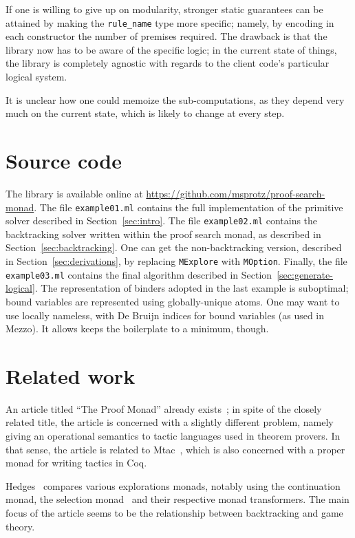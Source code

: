 \documentclass{easychair}
\def\li{\lstinline}
\newcommand{\sref}[1]{Section~\ref{sec:#1}}
\begin{document}
If one is willing to give up on modularity, stronger static guarantees can be
attained by making the \li+rule_name+ type more specific; namely, by encoding in
each constructor the number of premises required. The drawback is that the
library now has to be aware of the specific logic; in the current state of
things, the library is completely agnostic with regards to the client code's
particular logical system.

It is unclear how one could memoize the sub-computations, as they depend very
much on the current state, which is likely to change at every step.

\section{Source code}

The library is available online at
\url{https://github.com/msprotz/proof-search-monad}. The file \li+example01.ml+
contains the full implementation of the primitive solver described in
\sref{intro}. The file \li+example02.ml+ contains the backtracking solver
written within the proof search monad, as described in \sref{backtracking}. One
can get the non-backtracking version, described in \sref{derivations}, by
replacing \li+MExplore+ with \li+MOption+. Finally, the file \li+example03.ml+
contains the final algorithm described in \sref{generate-logical}. The
representation of binders adopted in the last example is suboptimal; bound
variables are represented using globally-unique atoms. One may want to use
locally nameless, with De Bruijn indices for bound variables (as used in Mezzo).
It allows keeps the boilerplate to a minimum, though.

\section{Related work}

An article titled ``The Proof Monad'' already exists~\cite{kirchner-munoz-10};
in spite of the closely related title, the article is concerned with a slightly
different problem, namely giving an operational semantics to tactic languages
used in theorem provers. In that sense, the article is related to
Mtac~\cite{ziliani-13}, which is also concerned with a proper monad for writing
tactics in Coq.

Hedges~\cite{hedges-14} compares various explorations monads, notably using the
continuation monad, the selection monad~\cite{escardo-2010} and their respective
monad transformers. The main focus of the article seems to be the relationship
between backtracking and game theory.
\end{document}
